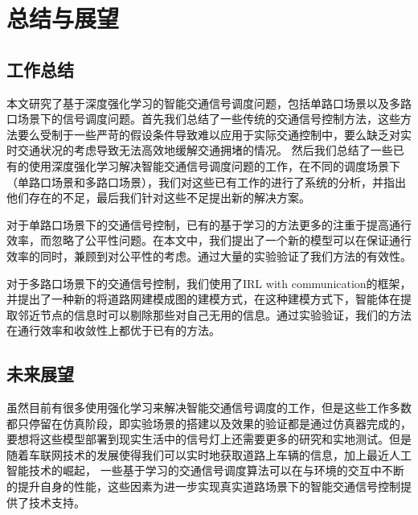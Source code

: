 \chapter{总结与展望}
\section{工作总结}
本文研究了基于深度强化学习的智能交通信号调度问题，包括单路口场景以及多路口场景下的信号调度问题。首先我们总结了一些传统的交通信号控制方法，这些方法要么受制于一些严苛的假设条件导致难以应用于实际交通控制中，要么缺乏对实时交通状况的考虑导致无法高效地缓解交通拥堵的情况。
然后我们总结了一些已有的使用深度强化学习解决智能交通信号调度问题的工作，在不同的调度场景下（单路口场景和多路口场景），我们对这些已有工作的进行了系统的分析，并指出他们存在的不足，最后我们针对这些不足提出新的解决方案。

对于单路口场景下的交通信号控制，已有的基于学习的方法更多的注重于提高通行效率，而忽略了公平性问题。在本文中，我们提出了一个新的模型可以在保证通行效率的同时，兼顾到对公平性的考虑。通过大量的实验验证了我们方法的有效性。

对于多路口场景下的交通信号控制，我们使用了IRL with communication的框架，并提出了一种新的将道路网建模成图的建模方式，在这种建模方式下，智能体在提取邻近节点的信息时可以剔除那些对自己无用的信息。通过实验验证，我们的方法在通行效率和收敛性上都优于已有的方法。

\section{未来展望}
虽然目前有很多使用强化学习来解决智能交通信号调度的工作，但是这些工作多数都只停留在仿真阶段，即实验场景的搭建以及效果的验证都是通过仿真器完成的，要想将这些模型部署到现实生活中的信号灯上还需要更多的研究和实地测试。但是随着车联网技术的发展使得我们可以实时地获取道路上车辆的信息，加上最近人工智能技术的崛起，
一些基于学习的交通信号调度算法可以在与环境的交互中不断的提升自身的性能，这些因素为进一步实现真实道路场景下的智能交通信号控制提供了技术支持。